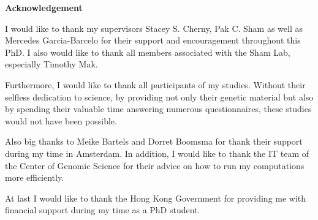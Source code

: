 \documentclass[header.tex]{subfiles}
\begin{document}
\begin{center}
  {\textbf{Acknowledgement}}
\end{center}

I would like to thank my supervisors Stacey S. Cherny, Pak C. Sham as well as Mercedes Garcia-Barcelo for their support and encouragement throughout this PhD\@.
I also would like to thank all members associated with the Sham Lab, especially Timothy Mak.

Furthermore, I would like to thank all participants of my studies.
Without their selfless dedication to science, by providing not only their genetic material but also by spending their valuable time answering numerous questionnaires, these studies would not have been possible.

Also big thanks to Meike Bartels and Dorret Boomsma for thank their support during my time in Amsterdam.
In addition, I would like to thank the IT team of the Center of Genomic Science for their advice on how to run my computations more efficiently.  

At last I would like to thank the Hong Kong Government for providing me with financial support during my time as a PhD student. 
\end{document}
